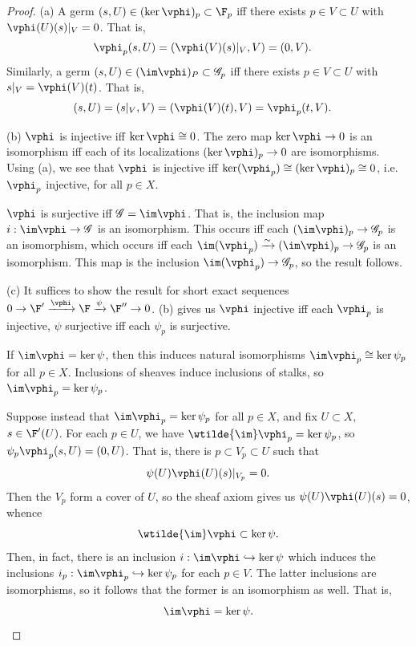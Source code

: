 \documentclass[12pt]{amsart}
\newcommand{\G}{\mathscr{G}}
\begin{document}
\begin{proof}
  (a) A germ $(s,U)\in (\ker\vphi)_p\subset \F_p$ iff there exists $p\in V\subset U$ with $\vphi(U)(s)|_V = 0$. That is, 
  \begin{align*}
    \vphi_p(s,U) &= (\vphi(V)(s)|_V,V)=(0,V).
  \end{align*}
  Similarly, a germ $(s,U)\in (\im\vphi)_P\subset \G_p$ iff there exists $p\in V\subset U$ with $s|_V= \vphi(V)(t)$. That is,
  \begin{align*}
    (s,U) &= (s|_V,V) = (\vphi(V)(t),V) 
    = \vphi_p(t,V).
  \end{align*}

  (b) $\vphi$ is injective iff $\ker\vphi\cong 0$. The zero map $\ker\vphi\to 0$ is an isomorphism iff each of its localizations $(\ker\vphi)_p\to 0$ are isomorphisms. Using (a), we see that $\vphi$ is injective iff $\ker(\vphi_p)\cong (\ker\vphi)_p\cong 0$, i.e. $\vphi_p$ injective, for all $p\in X$.

  $\vphi$ is surjective iff $\G = \im\vphi$. That is, the inclusion map $i:\im\vphi\to \G$ is an isomorphism.
  This occurs iff each $(\im\vphi)_p\to \G_p$ is an isomorphism, which occurs iff each $\im(\vphi_p)\xrightarrow{\sim} (\im\vphi)_p\to \G_p$ is an isomorphism. 
  This map is the inclusion $\im(\vphi_p)\to \G_p$, so the result follows.

  (c) It suffices to show the result for short exact sequences $0\to \F'\xrightarrow{\vphi}\F\xrightarrow{\psi}\F''\to 0$.
  (b) gives us $\vphi$ injective iff each $\vphi_p$ is injective, $\psi$ surjective iff each $\psi_p$ is surjective. 

  If $\im\vphi=\ker\psi$, then this induces natural isomorphisms $\im\vphi_p\cong\ker\psi_p$ for all $p\in X$.
  Inclusions of sheaves induce inclusions of stalks, so $\im\vphi_p=\ker\psi_p$.

  Suppose instead that $\im\vphi_p=\ker\psi_p$ for all $p\in X$, and fix $U\subset X$, $s\in \F'(U)$.
  For each $p\in U$, we have $\wtilde{\im}\vphi_p= \ker\psi_p$, so $\psi_p\vphi_p(s,U)=(0,U)$.
  That is, there is $p\subset V_p\subset U$ such that 
  \[
    \psi(U)\vphi(U)(s)|_{V_p} =0.
  \]
  Then the $V_p$ form a cover of $U$, so the sheaf axiom gives us $\psi(U)\vphi(U)(s)=0$, whence
  \[
    \wtilde{\im}\vphi\subset \ker\psi.
  \] 
  Then, in fact, there is an inclusion $i:\im\vphi\hookrightarrow \ker\psi$ which induces the inclusions $i_p:\im\vphi_p\hookrightarrow\ker\psi_p$ for each $p\in V$.
  The latter inclusions are isomorphisms, so it follows that the former is an isomorphism as well.
  That is,
  \[
    \im\vphi=\ker\psi.
  \] 
\end{proof}
\end{document}
